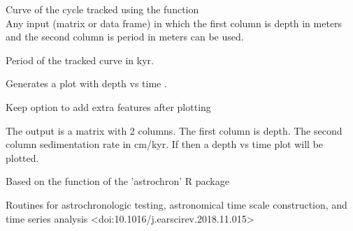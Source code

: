 \documentclass[a4paper]{book}
\begin{document}
%
\begin{Arguments}
\begin{ldescription}
\item[\code{tracked\_cycle\_curve}] Curve of the cycle tracked using the
 function \\{}
Any input (matrix or data frame) in which the first column is depth in
meters and the second column is period in meters can be used.

\item[\code{tracked\_cycle\_period}] Period of the tracked curve in kyr.

\item[\code{genplot}] Generates a plot with depth vs time .

\item[\code{keep\_editable}] Keep option to add extra features after plotting  
\end{ldescription}
\end{Arguments}
%
\begin{Value}
The output is a matrix with 2 columns.
The first column is depth.
The second column sedimentation rate in cm/kyr.
If  then a depth vs time plot will be plotted.
\end{Value}
%
\begin{Author}
Based on the 
function of the 'astrochron' R package
\end{Author}
%
\begin{References}
Routines for astrochronologic testing, astronomical time scale construction, and
time series analysis <doi:10.1016/j.earscirev.2018.11.015>
\end{References}
%
\end{document}
